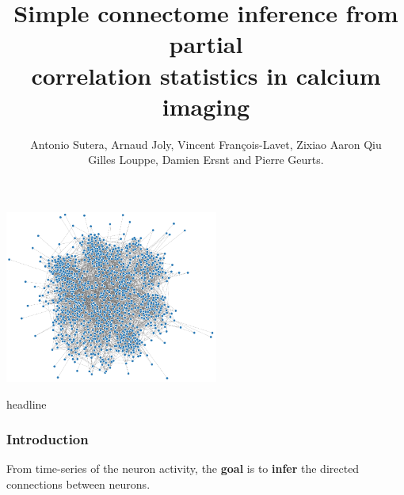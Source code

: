 \documentclass[final]{beamer}
\title{Simple connectome inference from partial\\[1ex]
correlation statistics in calcium imaging}
\author{{\small Antonio Sutera, Arnaud Joly, Vincent François-Lavet, Zixiao Aaron Qiu\\[1ex] Gilles Louppe, Damien Ersnt and Pierre Geurts.}}
\date{}
\begin{document}

\begin{frame}
	
\vspace{-0cm}

	\begin{center}
	\includegraphics[width=7cm]{images/network.png}
	\end{center}

\vspace{-9.5cm}
  \begin{beamercolorbox}[wd=\paperwidth, ignorebg]{headline}
    \begin{center}
      
    \end{center}
  \end{beamercolorbox}

\end{frame}



\begin{frame}

\frametitle{Introduction}


From {\color{i6blue} time-series of the neuron activity}, the \textbf{goal} is to {\color{red} \textbf{infer} the directed connections between neurons}.

\end{frame}

\end{document}
